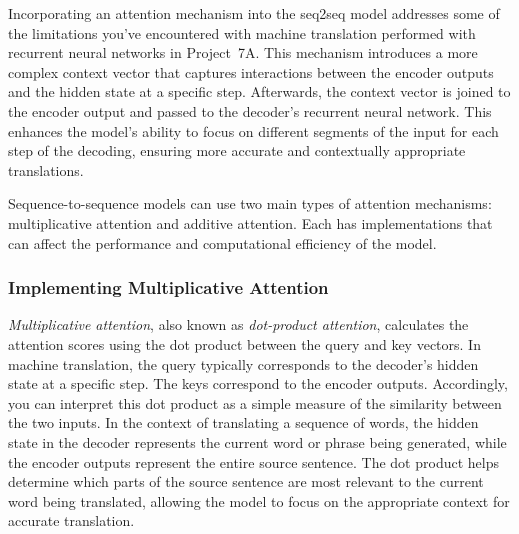 Incorporating an attention mechanism into the seq2seq model addresses some of the limitations you've encountered with machine translation performed with recurrent neural networks in Project~7A. 
This mechanism introduces a more complex context vector that captures interactions between the encoder outputs and the hidden state at a specific step. Afterwards, the context vector is joined to the encoder output and passed to the decoder's recurrent neural network. This enhances the model’s ability to focus on different segments of the input for each step of the decoding, ensuring more accurate and contextually appropriate translations.

Sequence-to-sequence models can use two main types of attention mechanisms: multiplicative attention and additive attention. Each has implementations that can affect the performance and computational efficiency of the model.

\subsubsection{Implementing Multiplicative Attention}

\emph{Multiplicative attention}, also known as \emph{dot-product attention},
calculates the attention scores using the dot product between the query and key vectors. In machine translation, the query typically corresponds to the decoder's hidden state at a specific step. The keys correspond to the encoder outputs. Accordingly, you can interpret this dot product as a simple measure of the similarity between the two inputs. 
In the context of translating a sequence of words, the hidden state in the decoder represents the current word or phrase being generated, while the encoder outputs represent the entire source sentence. The dot product helps determine which parts of the source sentence are most relevant to the current word being translated, allowing the model to focus on the appropriate context for accurate translation.

